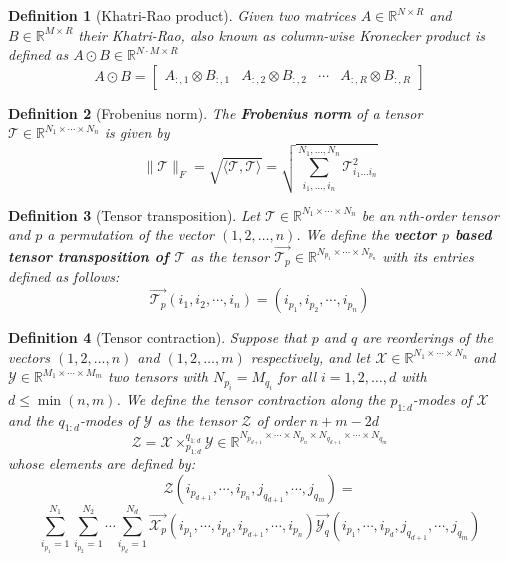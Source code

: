\documentclass[11pt,a4paper,openright,oneside]{book}
\numberwithin{equation}{section}
\newtheorem{defn0}{Definition}[chapter]
\newenvironment{definition}{ \begin{defn0}}{\end{defn0}}
\begin{document}
\begin{definition}[Khatri-Rao product]
     Given two matrices $A \in \mathbb{R}^{N \times R}$ and $B \in \mathbb{R}^{M \times R}$ their
Khatri-Rao, also known as column-wise Kronecker product is defined as $A \odot B \in \mathbb{R}^{N \cdot M \times R}$
    $$ A \odot B = \begin{bmatrix} A_{:,1} \otimes B_{:,1} & A_{:,2} \otimes B_{:,2} & \cdots & A_{:,R} \otimes B_{:,R}  \end{bmatrix}$$
        

\end{definition}

\begin{definition}[Frobenius norm]
The \textbf{Frobenius norm} of a tensor $\mathcal{T} \in \mathbb{R}^{N_1 \times \cdots \times N_n}$ is given by
$$\|\mathcal{T}\|_F = \sqrt{\langle \mathcal{T}, \mathcal{T} \rangle} = \sqrt{\sum_{i_1, \dots, i_n}^{N_1, \dots, N_n}
\mathcal{T}_{i_1 \dots i_n}^2}$$
\end{definition}

\begin{definition}[Tensor transposition]
     Let $\mathcal{T} \in \mathbb{R}^{N_1 \times \cdots \times N_n}$
    be an $n$th-order tensor and $p$ a permutation of the vector $(1, 2, \dots, n)$. We define the \textbf{vector $p$ based tensor
    transposition of $\mathcal{T}$} as the tensor $\overrightarrow{\mathcal{T}_p} \in \mathbb{R}^{N_{p_1} \times \cdots \times N_{p_n}}$ with its entries defined as follows:
    $$\overrightarrow{\mathcal{T}_p}(i_1, i_2, \cdots, i_n) = (i_{p_1}, i_{p_2}, \cdots, i_{p_n})$$
\end{definition}

\begin{definition}[Tensor contraction]
     Suppose that $p$ and $q$ are reorderings of the vectors
    $(1,2,\dots,n)$ and $(1,2,\dots,m)$ respectively, and let ${\mathcal{X} \in \mathbb{R}^{N_1 \times \cdots \times N_n}}$ 
    and $\mathcal{Y} \in \mathbb{R}^{M_1 \times \cdots \times M_m}$ two tensors with $N_{p_i} = M_{q_i}$ for all $i = 1,2,\dots,d$
    with $d \leqslant \min{(n, m)}$. We define the tensor contraction along the $p_{1:d}$-modes of $\mathcal{X}$ and the $q_{1:d}$-modes
    of $\mathcal{Y}$ as the tensor $\mathcal{Z}$ of order $n + m - 2d$
$$\mathcal{Z} = \mathcal{X} \times_{p_{1:d}}^{q_{1:d}} \mathcal{Y} \in \mathbb{R}^{N_{p_{d+1}} \times \cdots \times N_{p_{n}} \times N_{q_{d+1}} \times \cdots \times N_{q_m}}$$
whose elements are defined by:
$$\mathcal{Z}(i_{p_{d+1}}, \cdots, i_{p_n}, j_{q_{d+1}}, \cdots, j_{q_m}) = $$$$ \sum_{i_{p_1} = 1}^{N_1} \sum_{i_{p_2} = 1}^{N_2} \cdots \sum_{i_{p_d} = 1}^{N_d}
\overrightarrow{\mathcal{X}_p}(i_{p_1}, \cdots, i_{p_d}, i_{p_{d+1}}, \cdots, i_{p_n}) \overrightarrow{\mathcal{Y}_q}(i_{p_1}, \cdots, i_{p_d}, j_{q_{d+1}}, \cdots, j_{q_m})$$
\end{definition}
\end{document}
